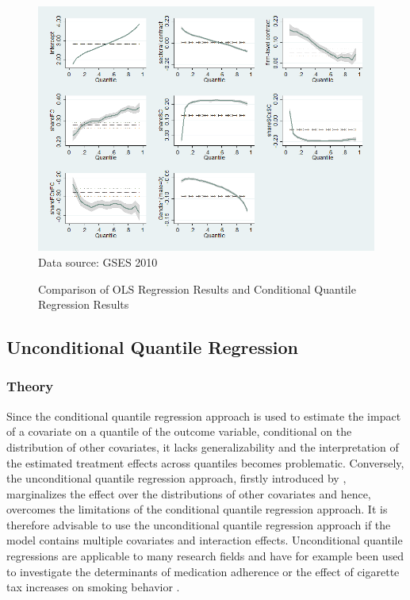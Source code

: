 \begin{landscape}
\begin{figure}[ht]
  \begin{center}
   \caption{Comparison of OLS Regression Results and Conditional Quantile Regression Results}
   \bigskip
    \includegraphics[width=195mm,scale=0.5]{finaldraft}\\
    \label{Fig:CQROLS}
    \footnotesize Data source: GSES 2010
  \end{center}
\end{figure}
\end{landscape}



\subsection{Unconditional Quantile Regression}\label{SubSec:UQR}


\subsubsection{Theory}
Since the conditional quantile regression approach is used to estimate the impact of a covariate on a quantile of the outcome variable, conditional on the distribution of other covariates, it lacks generalizability and the interpretation of the estimated treatment effects across quantiles becomes problematic.
Conversely, the unconditional quantile regression approach, firstly introduced by \cite{Firpo&Fortin&Lemieux:09}, marginalizes the effect over the distributions of other covariates and hence, overcomes the limitations of the conditional quantile regression approach. It is therefore advisable to use the unconditional quantile regression approach if the model contains multiple covariates and interaction effects. Unconditional quantile regressions are applicable to many research fields and have for example been used to investigate the determinants of medication adherence \citep{Borah&Basu:2013} or the effect of cigarette tax increases on smoking behavior \citep{Maclean&Marti&Webber:2014}.

